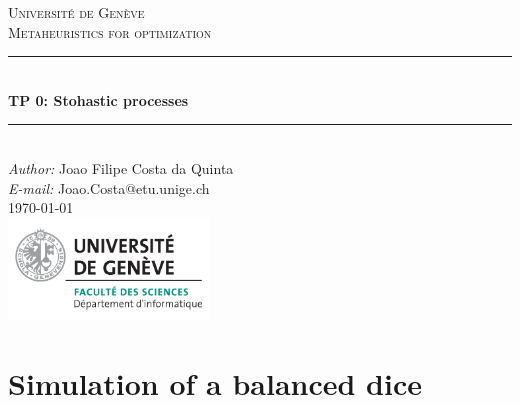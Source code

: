 \documentclass[a4paper]{article}
\makeatletter
\newcommand\TPid{0}
\newcommand\TPname{Stohastic processes}
\newcommand\Firstname{Joao Filipe}
\newcommand\Familyname{Costa da Quinta}
\newcommand\Email{Joao.Costa@etu.unige.ch}
\makeatother
\begin{document}
\begin{titlepage}

\newcommand{\HRule}{\rule{\linewidth}{0.5mm}} 							%

\center 
 
\textsc{\LARGE Université de Genève}\\[1cm]

\textsc{\Large Metaheuristics for optimization}\\[0.2cm]									%
\HRule \\[0.8cm]
{ \huge \bfseries TP \TPid : \TPname}\\[0.7cm]								%
\HRule \\[2cm]
\large
\emph{Author:} \Firstname \; \Familyname\\[0.5cm]		
\emph{E-mail:} {\color{blue}\Email}\\[7cm]		
{\large \today}\\[2cm]
\includegraphics[width=0.4\textwidth]{images/unige_csd.png}\\[1cm] 	%
\vfill 
\end{titlepage}


\newpage
\section*{Simulation of a balanced dice}
\end{document}
